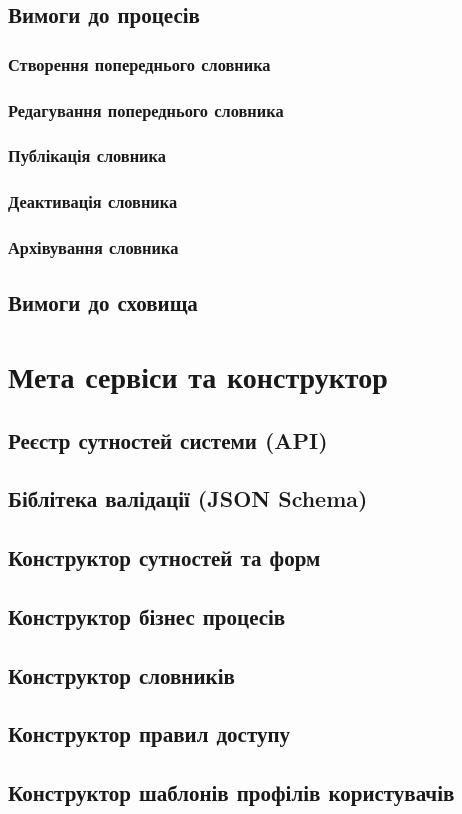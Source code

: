 \subsection{Вимоги до процесів}

\subsubsection{Створення попереднього словника}

\subsubsection{Редагування попереднього словника}

\subsubsection{Публікація словника}

\subsubsection{Деактивація словника}

\subsubsection{Архівування словника}

\subsection{Вимоги до сховища}

\section{Мета сервіси та конструктор}

\subsection{Реєстр сутностей системи (API)}

\subsection{Біблітека валідації (JSON Schema)}

\subsection{Конструктор сутностей та форм}

\subsection{Конструктор бізнес процесів}

\subsection{Конструктор словників}

\subsection{Конструктор правил доступу}

\subsection{Конструктор шаблонів профілів користувачів}

